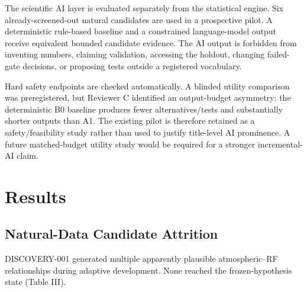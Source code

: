 \documentclass{ieeeaccess}
\begin{document}
The scientific AI layer is evaluated separately from the statistical engine. Six already-screened-out natural candidates are used in a prospective pilot. A deterministic rule-based baseline and a constrained language-model output receive equivalent bounded candidate evidence. The AI output is forbidden from inventing numbers, claiming validation, accessing the holdout, changing failed-gate decisions, or proposing tests outside a registered vocabulary.

Hard safety endpoints are checked automatically. A blinded utility comparison was preregistered, but Reviewer C identified an output-budget asymmetry: the deterministic B0 baseline produces fewer alternatives/tests and substantially shorter outputs than A1. The existing pilot is therefore retained as a safety/\allowbreak feasibility study rather than used to justify title-level AI prominence. A future matched-budget utility study would be required for a stronger incremental-AI claim.

\section{Results}\label{results}

\subsection{Natural-Data Candidate Attrition}\label{natural-data-candidate-attrition}

DISCOVERY-001 generated multiple apparently plausible atmospheric--RF relationships during adaptive development. None reached the frozen-hypothesis state (Table III).
\end{document}
